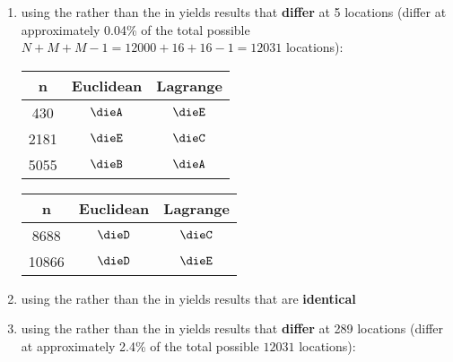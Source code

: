 \begin{example}
\begin{enumerate}
\begin{enumerate}
      \item using the  rather than the  in 
             yields results that \textbf{differ} at 5 locations
            (differ at approximately 0.04\% of the total possible 
            $N+M+M-1=12000+16+16-1=12031$ locations): %
            \\\indentx\begin{tabstr}{0.75}\begin{tabular}[t]{|c|c|c|}
                         \hline
                           n   & Euclidean & Lagrange
                         \\\hline
                              430 & $\dieA$ & $\dieE$
                         \\  2181 & $\dieE$ & $\dieC$
                         \\  5055 & $\dieB$ & $\dieA$
                         \\\hline
                       \end{tabular}\end{tabstr}
              \indentx\begin{tabstr}{0.75}\begin{tabular}[t]{|c|c|c|}
                         \hline
                           n   & Euclidean & Lagrange
                         \\\hline
                             8688 & $\dieD$ & $\dieC$
                         \\ 10866 & $\dieD$ & $\dieE$
                         \\\hline
                       \end{tabular}\end{tabstr}

      \item using the  rather than the  in 
             yields results that are 
            \textbf{identical} %

      \item using the  rather than the  in 
             yields results that \textbf{differ} at 289 locations
            (differ at approximately 2.4\% of the total possible 
            $12031$ locations): %
    \end{enumerate}


\end{enumerate}
\end{example}
